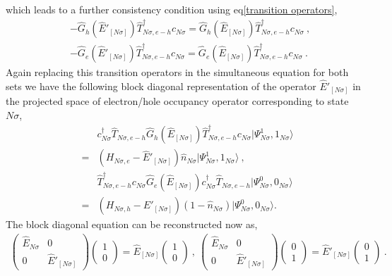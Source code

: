 \documentclass[12pt,a4paper]{article}
\begin{document}
which leads to a further consistency condition using eq\eqref{transition operators},
\begin{eqnarray}
&&-\hat{G}_{h}(\hat{E}'_{[N\sigma]})\hat{T}^{\dagger}_{N\sigma,e-h}c_{N\sigma} = \hat{G}_{h}(\hat{E}_{[N\sigma]})\hat{T}^{\dagger}_{N\sigma,e-h}c_{N\sigma}~,~\nonumber\\
&&-\hat{G}_{e}(\hat{E}'_{[N\sigma]})\hat{T}^{\dagger}_{N\sigma,e-h}c_{N\sigma} = \hat{G}_{e}(\hat{E}_{[N\sigma]})\hat{T}^{\dagger}_{N\sigma,e-h}c_{N\sigma}~.~~\label{consistency}
\end{eqnarray}
Again replacing this transition operators in the simultaneous equation for both sets we have the following block diagonal representation of the operator $\hat{E}'_{[N\sigma]}$ in the projected space of electron/hole occupancy operator corresponding to state $N\sigma$,
\begin{eqnarray}
&&c^{\dagger}_{N\sigma}\hat{T}_{N\sigma,e-h}\hat{G}_{h}(\hat{E}_{[N\sigma]})\hat{T}^{\dagger}_{N\sigma,e-h}c_{N\sigma}|\Psi^{1}_{N\sigma},1_{N\sigma}\rangle\nonumber\\
 &=& (H_{N\sigma,e}-\hat{E}'_{[N\sigma]})\hat{n}_{N\sigma}|\Psi^{1}_{N\sigma},1_{N\sigma}\rangle~,~\nonumber\\
&&\hat{T}^{\dagger}_{N\sigma,e-h}c_{N\sigma}\hat{G}_{e}(\hat{E}_{[N\sigma]})c^{\dagger}_{N\sigma}\hat{T}_{N\sigma,e-h}|\Psi^{0}_{N\sigma},0_{N\sigma}\rangle\nonumber\\
& =& (H_{N\sigma,h}-\hat{E}'_{[N\sigma]})(1-\hat{n}_{N\sigma})|\Psi^{0}_{N\sigma},0_{N\sigma}\rangle. 
\label{block_diag2}
\end{eqnarray}
The block diagonal equation can be reconstructed now as,
\begin{eqnarray}
\begin{pmatrix}
\hat{E}_{N\sigma} & 0 \\
0 & \hat{E}'_{[N\sigma]}
\end{pmatrix}\begin{pmatrix}
1 \\ 0 
\end{pmatrix} = \hat{E}_{[N\sigma]} \begin{pmatrix}
1 \\ 0 
\end{pmatrix}~,~\begin{pmatrix}
\hat{E}_{N\sigma} & 0 \\
0 & \hat{E}'_{[N\sigma]}
\end{pmatrix}\begin{pmatrix}
0 \\ 1 
\end{pmatrix} = \hat{E}'_{[N\sigma]} \begin{pmatrix}
0 \\ 1 
\end{pmatrix}~.\label{block_diag_eqn}
\end{eqnarray}
\end{document}
